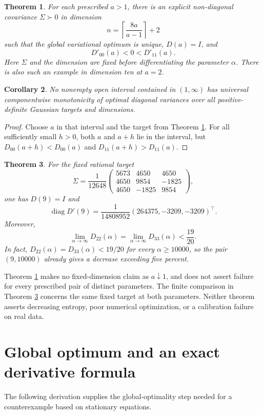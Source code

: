 \documentclass[11pt]{article}
\newtheorem{theorem}{Theorem}
\newtheorem{corollary}[theorem]{Corollary}
\theoremstyle{remark}\newtheorem{remark}[theorem]{Remark}
\newcommand{\diag}{\operatorname{diag}}
\begin{document}
\begin{theorem}\label{thm:all}
For each prescribed $a>1$, there is an explicit non-diagonal covariance
$\Sigma\succ0$ in dimension
\[
 n=\left\lceil\frac{8a}{a-1}\right\rceil+2
\]
such that the global variational optimum is unique, $D(a)=I$, and
\[
 D'_{00}(a)<0<D'_{11}(a).
\]
Here $\Sigma$ and the dimension are fixed before differentiating the
parameter $\alpha$. There is also such an example in dimension ten
at $a=2$.
\end{theorem}

\begin{corollary}\label{cor:interval}
No nonempty open interval contained in $(1,\infty)$ has universal
componentwise monotonicity of optimal diagonal variances over all
positive-definite Gaussian targets and dimensions.
\end{corollary}
\begin{proof}
Choose $a$ in that interval and the target from Theorem \ref{thm:all}.
For all sufficiently small $h>0$, both $a$ and $a+h$ lie in the interval,
but $D_{00}(a+h)<D_{00}(a)$ and $D_{11}(a+h)>D_{11}(a)$.
\end{proof}

\begin{theorem}\label{thm:three}
For the fixed rational target
\begin{equation}\label{eq:sigma3}
 \Sigma=\frac1{12648}
 \begin{pmatrix}
 5673&4650&4650\\
 4650&9854&-1825\\
 4650&-1825&9854
 \end{pmatrix},
\end{equation}
one has $D(9)=I$ and
\[
 \diag D'(9)=\frac1{14808952}(264375,-3209,-3209)^\top.
\]
Moreover,
\[
 \lim_{\alpha\to\infty}D_{22}(\alpha)
 =\lim_{\alpha\to\infty}D_{33}(\alpha)<\frac{19}{20}.
\]
In fact, $D_{22}(\alpha)=D_{33}(\alpha)<19/20$ for every
$\alpha\ge10000$, so the pair $(9,10000)$ already gives a decrease
exceeding five percent.
\end{theorem}

Theorem \ref{thm:all} makes no fixed-dimension claim as $a\downarrow1$,
and does not assert failure for every prescribed pair of distinct
parameters. The finite comparison in Theorem \ref{thm:three} concerns
the same fixed target at both parameters. Neither theorem
asserts decreasing entropy, poor numerical optimization, or a
calibration failure on real data.

\section{Global optimum and an exact derivative formula}
The following derivation supplies the global-optimality step needed for
a counterexample based on stationary equations.
\end{document}
